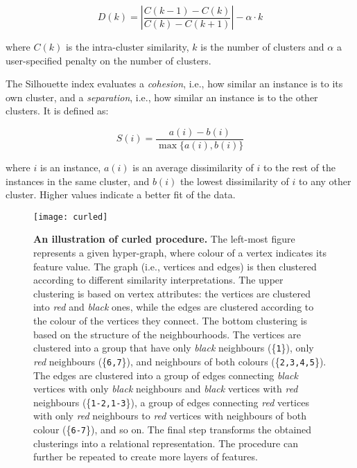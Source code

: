 \begin{equation}
	D(k) = \left| \frac{C(k-1) - C(k)}{C(k) - C(k+1)} \right| - \alpha \cdot k
	\label{eq:Sat}
\end{equation}

where $C(k)$ is the intra-cluster similarity, $k$ is the number of clusters and $\alpha$ a user-specified penalty on the number of clusters.


The Silhouette index evaluates a \textit{cohesion}, i.e., how similar an instance is to its own cluster, and a \textit{separation}, i.e., how similar an instance is to the other clusters.
It is defined as:

\begin{equation}
    S(i) = \frac{a(i) - b(i)}{ \max \{ a(i), b(i)\}}
\end{equation}

where $i$ is an instance, $a(i)$ is an average dissimilarity of $i$ to the rest of the instances in the same cluster, and $b(i)$ the lowest dissimilarity of $i$ to any other cluster.
Higher values indicate a better fit of the data.


\begin{sidewaysfigure}
  \centering
  \medskip
  \texttt{[image: curled]}
  \caption[An illustration of \gls{curled} procedure]{\textbf{An illustration of \gls{curled} procedure.} The left-most figure represents a given hyper-graph, where colour of a vertex indicates its feature value. The graph (i.e., vertices and edges) is then clustered according to different similarity interpretations. The upper clustering is based on vertex attributes: the vertices are clustered into \textit{red} and \textit{black} ones, while the edges are clustered according to the colour of the vertices they connect. The bottom clustering is based on the structure of the neighbourhoods. The vertices are clustered into a group that have only \textit{black} neighbours (\{{\tt1}\}), only \textit{red} neighbours (\{\texttt{6,7}\}), and neighbours of both colours (\{\texttt{2,3,4,5}\}). The edges are clustered into a group of edges connecting \textit{black} vertices with only \textit{black} neighbours and \textit{black} vertices with \textit{red} neighbours (\{\texttt{1-2,1-3}\}), a group of edges connecting \textit{red} vertices with only \textit{red} neighbours to \textit{red} vertices with neighbours of both colour (\{\texttt{6-7}\}), and so on. The final step transforms the obtained clusterings into a relational representation. The procedure can further be repeated to create more layers of features. }
  \label{fig:curled}
\end{sidewaysfigure}


